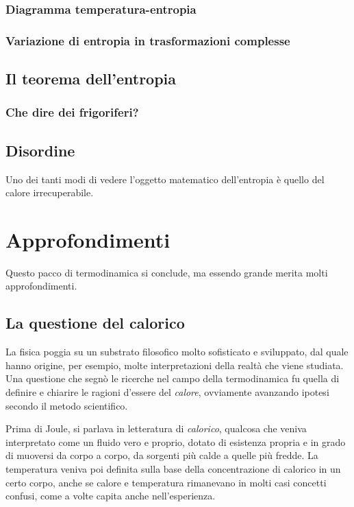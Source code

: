 \subsubsection*{Diagramma temperatura-entropia}

\subsubsection*{Variazione di entropia in trasformazioni complesse}



\subsection{Il teorema dell'entropia}


\subsubsection{Che dire dei frigoriferi?}

\subsection{Disordine}
Uno dei tanti modi di vedere l'oggetto matematico dell'entropia
è quello del calore irrecuperabile.


\section{Approfondimenti}
Questo pacco di termodinamica si conclude, ma essendo grande
merita molti approfondimenti.

\subsection{La questione del calorico}
La fisica poggia su un substrato filosofico molto sofisticato e
sviluppato, dal quale hanno origine, per esempio, molte interpretazioni
della realtà che viene studiata. Una questione che segnò le ricerche
nel campo della termodinamica fu quella di definire e chiarire le
ragioni d'essere del \textit{calore}, ovviamente avanzando ipotesi
secondo il metodo scientifico.

Prima di Joule, si parlava in letteratura di \textit{calorico},
qualcosa che veniva interpretato come un fluido vero e proprio,
dotato di esistenza propria e in grado di muoversi da corpo a
corpo, da sorgenti più calde a quelle più fredde. La temperatura
veniva poi definita sulla base della concentrazione di calorico
in un certo corpo, anche se calore e temperatura rimanevano in
molti casi concetti confusi, come a volte capita anche nell'esperienza.


